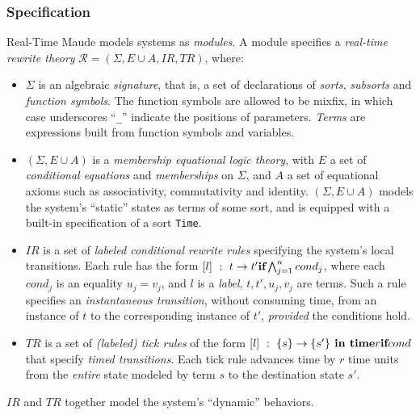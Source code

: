 \documentclass[12pt,onecolumn]{IEEEtranTIE}
\begin{document}
\subsubsection{Specification}
Real-Time Maude models systems as \emph{modules}. A module specifies a
\emph{real-time rewrite theory} $\mathcal{R} = (\Sigma,
\mathit{E}\cup\mathit{A} , \mathit{IR}, \mathit{TR})$, where:
\begin{itemize}
\item $\Sigma$ is an algebraic \emph{signature}, that is, a set of
  declarations of \emph{sorts}, \emph{subsorts} and \emph{function
    symbols}. The function symbols are allowed to be mixfix, in which
  case underscores ``\verb|_|'' indicate the positions of parameters.
  \emph{Terms} are expressions built from function symbols and
  variables.
\item $(\Sigma, \mathit{E}\cup\mathit{A})$ is a \emph{membership
  equational logic theory}, with $\mathit{E}$ a set of
  \emph{conditional equations} and \emph{memberships} on $\Sigma$, and
  $\mathit{A}$ a set of equational axioms such as associativity,
  commutativity and identity.  $(\Sigma, \mathit{E}\cup\mathit{A})$
  models the system's ``static'' states as terms of some sort, and is
  equipped with a built-in specification of a sort \verb|Time|.
\item $\mathit{IR}$ is a set of \emph{labeled conditional rewrite
  rules} specifying the system's local transitions. Each rule has the
  form $[l]~:~t\rightarrow t'\mbox{ \textbf{if}
  }\bigwedge^n_{j=1}cond_j$, where each $cond_j$ is an equality
  $u_j=v_j$, and $l$ is a \emph{label}, $t,t',u_j,v_j$ are terms. Such
  a rule specifies an \emph{instantaneous transition}, without
  consuming time, from an instance of $t$ to the corresponding
  instance of $t'$, \emph{provided} the conditions hold.
\item $\mathit{TR}$ is a set of \emph{(labeled) tick rules} of
  the form $[l]~:~\{s\}\rightarrow\{s'\} \mbox{\textbf{ in time}
  }r\mbox{ \textbf{if} }cond$ that specify \emph{timed
    transitions}. Each tick rule advances time by $r$ time units from
  the \emph{entire} state modeled by term $s$ to the destination state
  $s'$.
\end{itemize}
$\mathit{IR}$ and $\mathit{TR}$ together model the system's ``dynamic''
behaviors.
\end{document}

